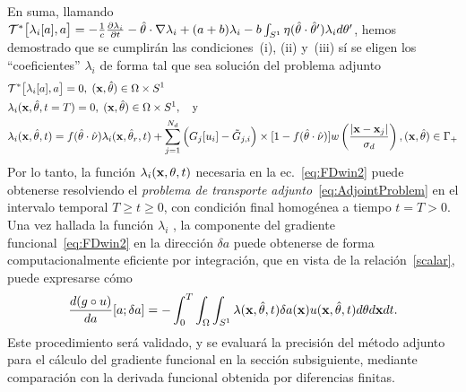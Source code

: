 En suma, llamando $\mathcal{T}^*\big[\lambda_i[a],a\big]=-\frac{1} {c}\frac{\partial
  \lambda_i} {\partial t}- \hat{\theta} \cdot \nabla \lambda_i + (a+b)\lambda_i-
b\int_{S^1}\eta(\hat{\theta}\cdot\hat{\theta} ') \lambda_i d\theta'$, hemos 
demostrado que se cumplirán las condiciones~(i), (ii) y~(iii) sí se eligen 
los ``coeficientes'' $\lambda_i$ de forma tal que sea solución 
del problema adjunto
\begin{equation}
\begin{split}
\begin{aligned}
  &\mathcal{T}^*\big[\lambda_i[a],a\big]=0, \; (\mathbf{x},\hat{\theta})
  \in \Omega\times S^1\\
  &\lambda_i(\mathbf{x},\hat{\theta},t=T)=0,\; (\mathbf{x},\hat{\theta})
  \in \Omega\times S^1,\quad\mbox{y}\\
  &\lambda_i(\mathbf{x},\hat{\theta},t) = f(\hat{\theta} \cdot \hat{\nu})
  \lambda_i(\mathbf{x},\hat{\theta}_r,t)+\sum_{j=1}^{N_d} \Big( G_j[u_i] 
  -\tilde {G}_{j,i} \Big) \times [1-f(\hat{\theta} \cdot \hat{\nu})] w\left( \frac{
      |\mathbf{x}-\mathbf{x}_j |}{\sigma_d} \right), (\mathbf{x},\hat{\theta}) \in \Gamma_+
\end{aligned}
\end{split}
\label{eq:AdjointProblem}
\end{equation}
Por lo tanto, la función $\lambda_i(\mathbf{x},\theta,t)$ necesaria en la 
ec.~\eqref{eq:FDwin2} puede obtenerse resolviendo el \textit{problema 
de transporte adjunto}~\eqref{eq:AdjointProblem} en el intervalo 
temporal  $T \geq t \geq 0$, con condición final homogénea a 
tiempo $t=T>0$. Una vez hallada la función $\lambda_i$ , 
la componente del gradiente funcional~\eqref{eq:FDwin2} en la 
dirección $\delta a$ puede obtenerse de forma computacionalmente 
eficiente por integración, que en vista de la relación~\eqref{scalar}, 
puede expresarse cómo
\begin{equation}\label{gradient_fin}
  \frac{d (g \circ u)}{da}[a;\delta a] =-\int_0^T \int_{\Omega} \int_{S^1} \lambda(\mathbf{x},\hat{\theta},t) \delta
  a(\mathbf{x}) u(\mathbf{x},\hat{\theta},t) d \theta d\mathbf{x} dt.
\end{equation}
Este procedimiento será validado, y se evaluará la precisión del método 
adjunto para el cálculo del gradiente funcional en la sección subsiguiente, 
mediante comparación con la derivada funcional obtenida por diferencias finitas. 

